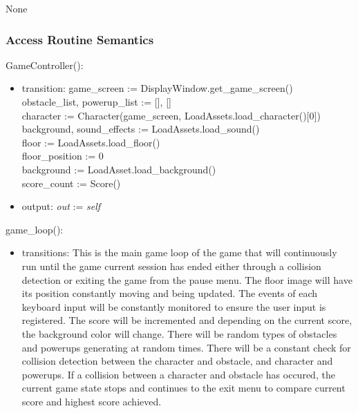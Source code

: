 \documentclass[12pt]{article}
\begin{document}
None

\subsubsection* {Access Routine Semantics}

GameController():
\begin{itemize}
    \item transition: game\_screen := DisplayWindow.get\_game\_screen()\\
    obstacle\_list, powerup\_list := [], []\\
    character := Character(game\_screen, LoadAssets.load\_character()[0])\\
    background, sound\_effects := LoadAssets.load\_sound()\\
    floor := LoadAssets.load\_floor()\\
    floor\_position := 0\\
    background := LoadAsset.load\_background()\\
    score\_count := Score()\\
    
    \item output: \textit{out} := \textit{self}
\end{itemize}

\noindent game\_loop():
\begin{itemize}
    \item transitions: This is the main game loop of the game that will continuously run until the game current session has ended either through a collision detection or exiting the game from the pause menu. The floor image will have its position constantly moving and being updated. The events of each keyboard input will be constantly monitored to ensure the user input is registered. The score will be incremented and depending on the current score, the background color will change. There will be random types of obstacles  and powerups generating at random times. There will be a constant check for collision detection between the character and obstacle, and character and powerups. If a collision between a character and obstacle has occured, the current game state stops and continues to the exit menu to compare current score and highest score achieved. 
\end{itemize}
\end{document}
